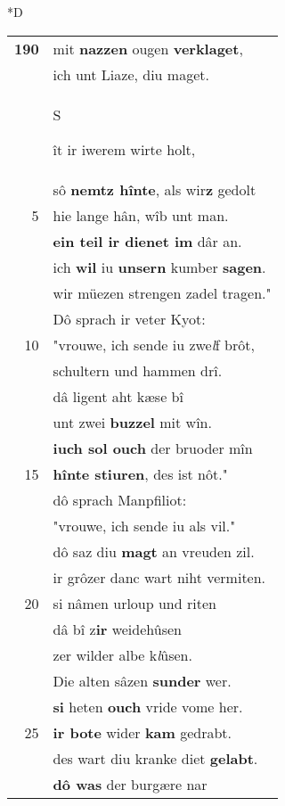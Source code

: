 \documentclass[8pt,a4paper,notitlepage]{article}
\begin{document}
\begin{table}[ht]
\begin{minipage}[t]{0.5\linewidth}
\small
\begin{center}*D
\end{center}
\begin{tabular}{rl}
\textbf{190} & mit \textbf{nazzen} ougen \textbf{verklaget},\\ 
 & ich unt Liaze, diu maget.\\ 
 & \begin{large}S\end{large}ît ir iwerem wirte holt,\\ 
 & sô \textbf{nemtz hînte}, als wir\textbf{z} gedolt\\ 
5 & hie lange hân, wîb unt man.\\ 
 & \textbf{ein teil ir dienet im} dâr an.\\ 
 & ich \textbf{wil} iu \textbf{unsern} kumber \textbf{sagen}.\\ 
 & wir müezen strengen zadel tragen."\\ 
 & Dô sprach ir veter Kyot:\\ 
10 & "vrouwe, ich sende iu zwe\textit{l}f brôt,\\ 
 & schultern und hammen drî.\\ 
 & dâ ligent aht kæse bî\\ 
 & unt zwei \textbf{buzzel} mit wîn.\\ 
 & \textbf{iuch sol ouch} der bruoder mîn\\ 
15 & \textbf{hînte stiuren}, des ist nôt."\\ 
 & dô sprach Manpfiliot:\\ 
 & "vrouwe, ich sende iu als vil."\\ 
 & dô saz diu \textbf{magt} an vreuden zil.\\ 
 & ir grôzer danc wart niht vermiten.\\ 
20 & si nâmen urloup und riten\\ 
 & dâ bî z\textbf{ir} weidehûsen\\ 
 & zer wilder albe k\textit{l}ûsen.\\ 
 & Die alten sâzen \textbf{sunder} wer.\\ 
 & \textbf{si} heten \textbf{ouch} vride vome her.\\ 
25 & \textbf{ir bote} wider \textbf{kam} gedrabt.\\ 
 & des wart diu kranke diet \textbf{gelabt}.\\ 
 & \textbf{dô was} der burgære nar\\ 

\end{tabular}
\end{minipage}
\end{table}
\end{document}
